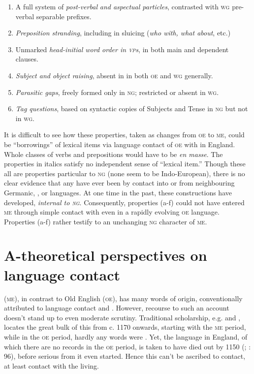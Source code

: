 \documentclass[output=paper]{LSP/langsci}
\begin{document}
\begin{enumerate}[label={(\alph*)}]
\item A full system of \textit{post-verbal} \textit{ and aspectual particles}, contrasted with \textsc{wg} pre-verbal separable prefixes.
\item \textit{Preposition stranding}, including in sluicing (\textit{who with, what about}, etc.)
\item Unmarked \textit{head-initial word order in \textsc{vp}s}, in both main and dependent clauses.
\item \textit{Subject and object raising}, absent in in both \textsc{oe} and \textsc{wg} generally.
\item \textit{Parasitic gaps}, freely formed only in \textsc{ng}; restricted or absent in \textsc{wg}. 
\item \textit{Tag questions}, based on syntactic copies of Subjects and Tense in \textsc{ng} but not in \textsc{wg}.
\end{enumerate}

It is difficult to see how these properties, taken as changes from \textsc{oe} to \textsc{me}, could be “borrowings” of lexical items via language contact of \textsc{oe} with  in England. Whole classes of verbs and prepositions would have to be  \textit{en masse}. The properties in italics satisfy no independent sense of “lexical item.” Though these all are properties particular to \textsc{ng} (none seem to be Indo-European), there is no clear evidence that any have ever been  by contact into or from neighbouring Germanic, , or  languages. At one time in the past, these constructions have developed, \textit{internal to \textsc{ng}}. Consequently, properties (a-f) could not have entered \textsc{me} through simple contact with  even in a rapidly evolving \textsc{oe} language. Properties (a-f) rather testify to an unchanging \textsc{ng} character of \textsc{me}. 


\section{A-theoretical perspectives on language contact}\label{sec:emonds:2}

 (\textsc{me}), in contrast to Old English (\textsc{oe}), has many words of  origin, conventionally attributed to language contact and . However, recourse to such an account doesn’t stand up to even moderate scrutiny. Traditional scholarship, e.g. \citet{Campbell1959} and \citet{Strang1970}, locates the great bulk of this  from c. 1170 onwards, starting with the \textsc{me} period, while in the \textsc{oe} period, hardly any  words were  \citep[99]{Baugh2002}. Yet, the  language in England, of which there are no records in the \textsc{oe} period, is taken to have died out by 1150 (\citealt{Thomason2016}; \citealt{Baugh2002}: 96), before serious  from it even started. Hence this  can’t be ascribed to contact, at least contact with the living.
\end{document}

